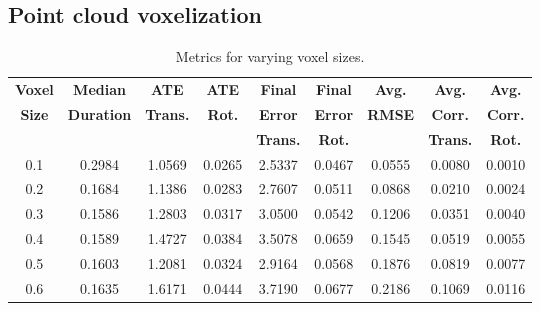 \subsection{Point cloud voxelization}
\begin{table}[h]
    \centering
    \begin{tabular}{|c|c|c|c|c|c|c|c|c|}
        \hline
        \textbf{Voxel} & \textbf{Median}   & \textbf{ATE}    & \textbf{ATE}  & \textbf{Final } & \textbf{Final} & \textbf{Avg.} & \textbf{Avg.}   & \textbf{Avg.}  \\
        \textbf{Size}  & \textbf{Duration} & \textbf{Trans.} & \textbf{Rot.} & \textbf{Error}  & \textbf{Error} & \textbf{RMSE} & \textbf{Corr.}  & \textbf{Corr.} \\
                       &                   & \textbf{}       & \textbf{}     & \textbf{Trans.} & \textbf{Rot.}  & \textbf{}     & \textbf{Trans.} & \textbf{Rot.}  \\
        \hline
        \hline
        0.1            & 0.2984            & 1.0569          & 0.0265        & 2.5337          & 0.0467         & 0.0555        & 0.0080          & 0.0010         \\
        0.2            & 0.1684            & 1.1386          & 0.0283        & 2.7607          & 0.0511         & 0.0868        & 0.0210          & 0.0024         \\
        0.3            & 0.1586            & 1.2803          & 0.0317        & 3.0500          & 0.0542         & 0.1206        & 0.0351          & 0.0040         \\
        0.4            & 0.1589            & 1.4727          & 0.0384        & 3.5078          & 0.0659         & 0.1545        & 0.0519          & 0.0055         \\
        0.5            & 0.1603            & 1.2081          & 0.0324        & 2.9164          & 0.0568         & 0.1876        & 0.0819          & 0.0077         \\
        0.6            & 0.1635            & 1.6171          & 0.0444        & 3.7190          & 0.0677         & 0.2186        & 0.1069          & 0.0116         \\
        \hline
    \end{tabular}
    \caption{Metrics for varying voxel sizes.}
    \label{tab:voxel_metrics}
\end{table}

